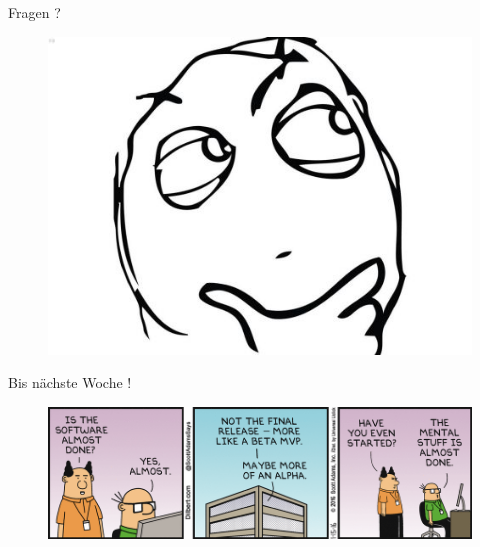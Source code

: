 \documentclass[18pt]{beamer}
\begin{document}
\begin{frame}{Fragen ?}
    \begin{figure}
        \includegraphics[scale=.3]{img/Question-Rage-Face.jpg}
    \end{figure}
\end{frame}

\begin{frame}{Bis nächste Woche !}
    \begin{figure}
        \includegraphics[scale=.4]{img/dt160115.png}
    \end{figure}
\end{frame}

\backupend
\end{document}
